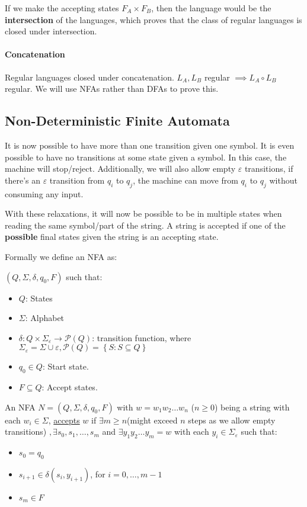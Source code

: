 \documentclass[12 pt]{article}
\begin{document}
If we make the accepting states $F_A \times F_B$, then the language
would be the \textbf{intersection} of the languages, which proves that
the class of regular languages is closed under intersection.

\paragraph{Concatenation} Regular languages closed under
concatenation. $L_A, L_B$ regular $\implies L_A \circ L_B$ regular. We
will use NFAs rather than DFAs to prove this.

\subsection{Non-Deterministic Finite Automata}
It is now possible to have more than one transition given one
symbol. It is even possible to have no transitions at some state given
a symbol. In this case, the machine will stop/reject. Additionally, we
will also allow empty $\varepsilon$ transitions, if there's an
$\varepsilon$ transition from $q_i$ to $q_j$, the machine can move
from $q_i$ to $q_j$ without consuming any input.

With these relaxations, it will now be possible to be in multiple
states when reading the same symbol/part of the string. A string is
accepted if one of the \textbf{possible} final states given the string
is an accepting state.

Formally we define an NFA as:

$(Q, \Sigma, \delta, q_0, F)$ such that:
\begin{itemize}
\item $Q$: States
\item $\Sigma$: Alphabet
\item $\delta: Q \times \Sigma_{\varepsilon} \to \mathcal{P}(Q)$:
  transition function, where $\Sigma_{\varepsilon} = \Sigma \cup \varepsilon,
  \mathcal{P}(Q) = \left\{S : S \subseteq Q\right\}$
\item $q_0 \in Q$: Start state.
\item $F \subseteq Q$: Accept states.
\end{itemize}

An NFA $N = (Q,\Sigma, \delta, q_0, F)$ with $w = w_1w_2\ldots w_n$
($n \geq 0$) being a string with each $w_i \in \Sigma$,
\underline{accepts} $w$ if $\exists m \geq n$(might exceed $n$ steps
as we allow empty transitions) $, \exists s_0, s_1, \ldots, s_m$ and
$\exists y_1y_2\ldots y_m=w$ with each $y_i \in \Sigma_{\varepsilon}$
such that:
\begin{itemize}
\item $s_0 = q_0$
\item $s_{i+1}\in \delta(s_i, y_{i+1})$, for $i = 0, \ldots, m-1$
\item $s_m \in F$
\end{itemize}
\end{document}
